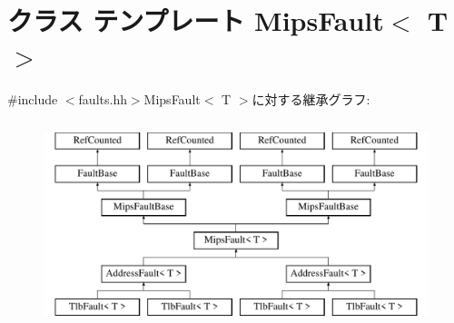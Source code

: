 \hypertarget{classMipsISA_1_1MipsFault}{
\section{クラス テンプレート MipsFault$<$ T $>$}
\label{classMipsISA_1_1MipsFault}
}


{\ttfamily \#include $<$faults.hh$>$}MipsFault$<$ T $>$に対する継承グラフ:\begin{figure}[H]
\begin{center}
\leavevmode
\includegraphics[height=6cm]{classMipsISA_1_1MipsFault}
\end{center}
\end{figure}
